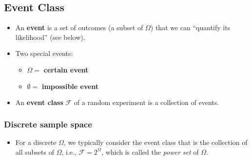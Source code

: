 \subsection{Event Class}
\begin{itemize}
\item An \textbf{event} is a set of outcomes (a subset of \(\Omega\))
   that we can ``quantify its likelihood'' (see below). 
\item Two special events: 
\begin{itemize}
\item \(\Omega =\)  \textbf{certain event} 
\item \(\emptyset =\) \textbf{impossible event}
\end{itemize}
\item An \textbf{event class} \(\mathcal{F}\) of a random experiment
is a collection of events.
\end{itemize}

\subsubsection{Discrete sample space}
\begin{itemize}
\item For a discrete \(\Omega\), we typically consider the event class
that is the collection of all subsets of \(\Omega\), i.e., \(\mathcal{F} = 2^{\Omega}\),
which is called the \emph{power set} of \(\Omega\).
\end{itemize}

